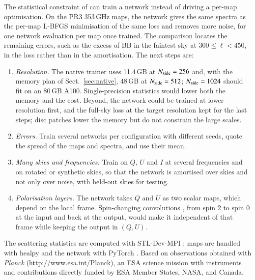 \documentclass{aa}
\newcommand{\nside}{N_{\rm side}}
\begin{document}
The statistical constraint of \citet{delouis2022} can train a network instead of driving a per-map optimisation. On the PR3 353\,GHz maps, the network gives the same spectra as the per-map L-BFGS minimisation of the same loss and removes more noise, for one network evaluation per map once trained. The comparison locates the remaining errors, such as the excess of BB in the faintest sky at $300\le\ell<450$, in the loss rather than in the amortisation. The next steps are:
\begin{enumerate}
  \item \emph{Resolution.} The native trainer uses 11.4\,GB at $\nside=256$ and, with the memory plan of Sect.~\ref{sec:native}, 48\,GB at $\nside=512$; $\nside=1024$ should fit on an 80\,GB A100. Single-precision statistics would lower both the memory and the cost. Beyond, the network could be trained at lower resolution first, and the full-sky loss at the target resolution kept for the last steps; disc patches lower the memory but do not constrain the large scales.
  \item \emph{Errors.} Train several networks per configuration with different seeds, quote the spread of the maps and spectra, and use their mean.
  \item \emph{Many skies and frequencies.} Train on $Q$, $U$ and $I$ at several frequencies and on rotated or synthetic skies, so that the network is amortised over skies and not only over noise, with held-out skies for testing.
  \item \emph{Polarisation layers.} The network takes $Q$ and $U$ as two scalar maps, which depend on the local frame. Spin-changing convolutions \citep{mcewen2026}, from spin 2 to spin 0 at the input and back at the output, would make it independent of that frame while keeping the output in $(Q,U)$.
\end{enumerate}

\begin{acknowledgements}
The scattering statistics are computed with STL-Dev-MPI \citep{stldev}; maps are handled with healpy \citep{zonca2019} and the network with PyTorch \citep{paszke2019}. Based on observations obtained with \textit{Planck} (\url{http://www.esa.int/Planck}), an ESA science mission with instruments and contributions directly funded by ESA Member States, NASA, and Canada.
\end{acknowledgements}



\end{document}
